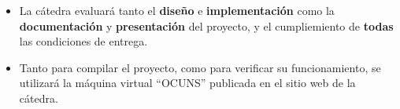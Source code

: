 \documentclass[12pt,a4paper]{article}
\begin{document}
\begin{itemize}
	
	\item La cátedra evaluará tanto el \textbf{diseño} e \textbf{implementación}
	como la \textbf{documentación} y \textbf{presentación} del proyecto, y el cumpliemiento de \textbf{todas} las condiciones de entrega.
	
	\item Tanto para compilar el proyecto, como para verificar su funcionamiento,
	se utilizará la máquina virtual “OCUNS” publicada en el sitio web de la
	cátedra.
	
\end{itemize}
\end{document}
